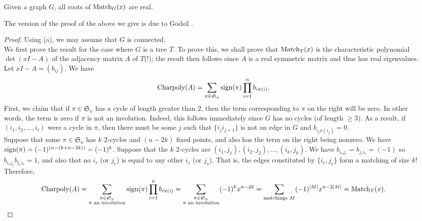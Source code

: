 
	\begin{ftheo}
		\label{theo: roots of matching polynomial real}
		Given a graph $G$, all roots of $\operatorname{Match}_G(x)$ are real.
	\end{ftheo}
	The version of the proof of the above we give is due to Godsil \cite{godsil-matching-poly-real-roots}.
	\begin{proof}
		Using (a), we may assume that $G$ is connected.\\
		We first prove the result for the case where $G$ is a tree $T$. To prove this, we shall prove that $\operatorname{Match}_T(x)$ is the characteristic polynomial $\det(xI-A)$ of the adjacency matrix $A$ of $T$(!); the result then follows since $A$ is a real symmetric matrix and thus has real eigenvalues.\\
		Let $xI - A = (b_{ij})$. We have
		\[ \operatorname{Charpoly}(A) = \sum_{\pi \in \mathfrak{S}_n} \operatorname{sign}(\pi) \prod_{i=1}^n b_{i\pi(i)}. \]
		First, we claim that if $\pi \in \mathfrak{S}_n$ has a cycle of length greater than $2$, then the term corresponding to $\pi$ on the right will be zero. In other words, the term is zero if $\pi$ is not an involution. Indeed, this follows immediately since $G$ has no cycles (of length $\ge 3$). As a result, if $(i_1,i_2,\ldots,i_t)$ were a cycle in $\pi$, then there must be some $j$ such that $\{i_j i_{j+1}\}$ is not an edge in $G$ and $b_{i_j \sigma(i_j)} = 0$.\\
		Suppose that some $\pi \in \mathfrak{S}_n$ has $k$ $2$-cycles and $(n-2k)$ fixed points, and also has the term on the right being nonzero. We have $\operatorname{sign}(\pi) = (-1)^{(n- (k + n-2k))} = (-1)^k$. Suppose that the $k$ $2$-cycles are $(i_1,j_1),(i_2,j_2),\ldots,(i_k,j_k)$. We have $b_{i_rj_r} = b_{j_ri_r} = (-1)$ so $b_{i_rj_r}b_{j_ri_r} = 1$, and also that no $i_r$ (or $j_r$) is equal to any other $i_s$ (or $j_s$). That is, the edges constituted by $\{i_r,j_r\}$ form a matching of size $k$! Therefore,
		\[ \operatorname{Charpoly}(A) = \sum_{\substack{\pi \in \mathfrak{S}_n \\ \text{$\pi$ an involution}}} \operatorname{sign}(\pi) \prod_{i=1}^n b_{i\pi(i)} = \sum_{\substack{\pi \in \mathfrak{S}_n \\ \text{$\pi$ an involution}}} (-1)^k x^{n-2k} = \sum_{\text{matchings $M$}} (-1)^{|M|} x^{n-2|M|} = \operatorname{Match}_T(x). \]


\end{proof}
